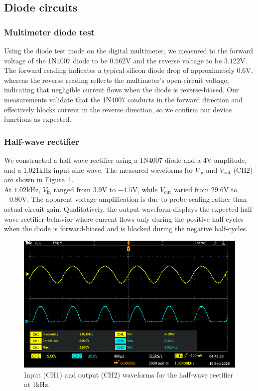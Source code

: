 \documentclass{article}
\begin{document}
\subsection{Diode circuits}

\subsubsection{Multimeter diode test}

Using the diode test mode on the digital multimeter, we measured to the forward
voltage of the 1N4007 diode to be $0.562\si{\volt}$ and the reverse voltage to 
be $3.122\si{\volt}$. The forward reading indicates a typical silicon diode drop
of approximately $0.6\si{\volt}$, whereas the reverse reading reflects the
multimeter's open-circuit voltage, indicating that negligible current flows when
the diode is reverse-biased. Our measurements validate that the 1N4007 conducts in
the forward direction and effectively blocks current in the reverse direction, so
we confirm our device functions as expected.


\subsubsection{Half-wave rectifier}

We constructed a half-wave rectifier using a 1N4007 diode and a $4\si{\volt}$
amplitude, and a $1.021\si{\kilo\hertz}$ input sine wave. The measured waveforms for
$V_{\text{in}}$ and $V_{\text{out}}$ (CH2) are shown in Figure~\ref{fig:half_wave}.\\

\noindent At $1.02\si{\kilo\hertz}$, $V_{\text{in}}$ ranged from $3.9\si{\volt}$ to 
$-4.5\si{\volt}$, while $V_{\text{out}}$ varied from $29.6\si{\volt}$ to $-0.80\si{\volt}$. 
The apparent voltage amplification is due to probe scaling rather than
actual circuit gain. Qualitatively, the output waveform displays the expected
half-wave rectifier behavior where current flows only during the positive 
half-cycles when the diode is forward-biased and is blocked during the negative
half-cycles.\\

\begin{figure}[H]
    \centering
    \includegraphics[width=0.65\linewidth]{4.2.b.png}
    \caption{Input (CH1) and output (CH2) waveforms for the half-wave rectifier at $1\si{\kilo\hertz}$.}
    \label{fig:half_wave}
\end{figure}
\end{document}
